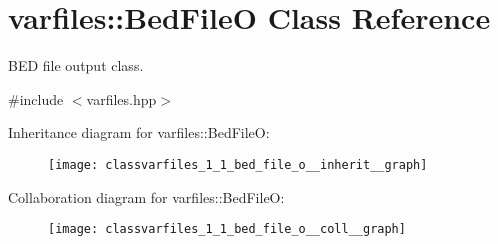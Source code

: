 \hypertarget{classvarfiles_1_1_bed_file_o}{}\section{varfiles\+:\+:Bed\+FileO Class Reference}
\label{classvarfiles_1_1_bed_file_o}


B\+ED file output class.  




{\ttfamily \#include $<$varfiles.\+hpp$>$}



Inheritance diagram for varfiles\+:\+:Bed\+FileO\+:\nopagebreak
\begin{figure}[H]
\begin{center}
\leavevmode
\texttt{[image: classvarfiles\_1\_1\_bed\_file\_o\_\_inherit\_\_graph]}
\end{center}
\end{figure}


Collaboration diagram for varfiles\+:\+:Bed\+FileO\+:\nopagebreak
\begin{figure}[H]
\begin{center}
\leavevmode
\texttt{[image: classvarfiles\_1\_1\_bed\_file\_o\_\_coll\_\_graph]}
\end{center}
\end{figure}
